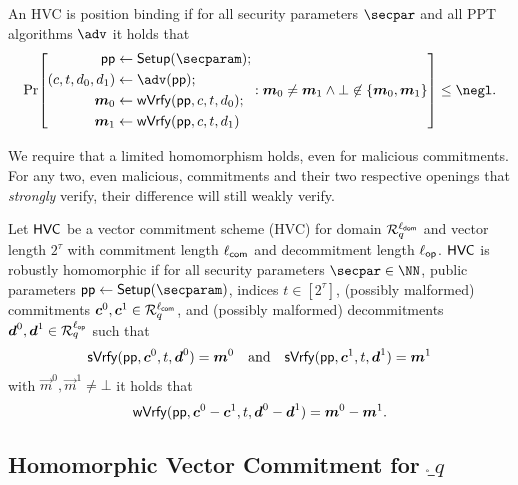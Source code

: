 \begin{definition}
  An HVC is position binding if for all security parameters $\secpar$ and all PPT algorithms $\adv$ it holds that
  \[
    \Pr\mleft[
      \begin{aligned}
      \params\gets{}&\setup(\secparam);\\
      (c,t,d_0,d_1) \gets{}& \adv(\params);\\
      \vec{m}_0 \gets{}& \wverify(\params,c,t,d_0);\\
      \vec{m}_1 \gets{}& \wverify(\params,c,t,d_1)
      \end{aligned}:
      \vec{m}_0\neq \vec{m}_1 \land \bot\not\in\{\vec{m}_0,\vec{m}_1\}
    \mright]\leq \negl.
  \]
\end{definition}
We require that a limited homomorphism holds, even for malicious commitments.
For any two, even malicious, commitments and their two respective openings that \emph{strongly} verify, their difference will still weakly verify.

\begin{definition}
  \label{def:malhomhvc}
  Let $\mathsf{HVC}$ be a vector commitment scheme (HVC) for domain $\mathcal{R}^{\ell_{\mathsf{dom}}}_q$ and vector length $2^\tau$ with commitment length ${\ell_{\mathsf{com}}}$ and decommitment length ${\ell_{\mathsf{op}}}$.
  $\mathsf{HVC}$ is robustly homomorphic if for all security parameters $\secpar\in\NN$, public parameters $\params\gets\setup(\secparam)$, indices $t\in[2^\tau]$, (possibly malformed) commitments $\boldsymbol{c}^0,\boldsymbol{c}^1 \in \mathcal{R}_q^{\ell_{\mathsf{com}}}$, and (possibly malformed) decommitments $\boldsymbol{d}^0,\boldsymbol{d}^1\in\mathcal{R}_q^{\ell_{\mathsf{op}}}$ such that
  \[
    \mathsf{sVrfy}(\mathsf{pp},\boldsymbol{c}^0, t,\boldsymbol{d}^0)=\boldsymbol{m}^0 \quad \text{and} \quad \mathsf{sVrfy}(\mathsf{pp},\boldsymbol{c}^1, t,\boldsymbol{d}^1)=\boldsymbol{m}^1
  \]
  with $\vec{m}^0,\vec{m}^1\neq \bot$ it holds that
  \[
    \mathsf{wVrfy}(\mathsf{pp},\boldsymbol{c}^0 - \boldsymbol{c}^1, t,\boldsymbol{d}^0 - \boldsymbol{d}^1)=\boldsymbol{m}^0 - \boldsymbol{m}^1.
  \]
\end{definition}


\subsection{Homomorphic Vector Commitment for $\ring_q$}

